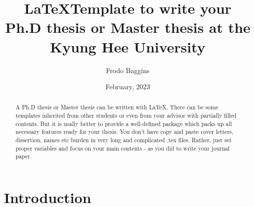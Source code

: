\documentclass[11pt,b5paper,oneside]{article}
\title{\LaTeX Template to write your Ph.D thesis or Master thesis at the Kyung Hee University}
\author{Frodo Baggins}
\date{February, 2023}
\begin{document}
\makefrontmatters

\begin{abstract}%
A Ph.D thesis or Master thesis can be written with \LaTeX. There can be some templates inherited from other students or even from your advisor with partially filled contents. But it is usally better to provide a well-defined package which packs up all necessary features ready for your thesis. You don't have copy and paste cover letters, dissertion, names etc burden in very long and complicated .tex files. Rather, just set proper variables and focus on your main contents - as you did to write your journal paper.
\end{abstract}

\section{Introduction}

\end{document}
